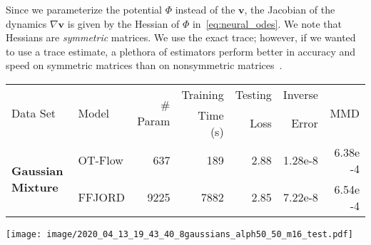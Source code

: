 \documentclass[letterpaper]{article}
\newcommand{\bfv}{\mathbf{v}}
\newcommand{\bfx}{\boldsymbol{x}}
\newcommand{\bfy}{\boldsymbol{y}}
\newcommand{\model}{OT-Flow} %
\def\eu{\ensuremath{\mathrm{e}}}
\begin{document}
    
    Since we parameterize the potential $\Phi$ instead of the $\bfv$, the Jacobian of the dynamics $\nabla \bfv$ is given by the Hessian of $\Phi$ in~\eqref{eq:neural_odes}. We note that Hessians are \emph{symmetric} matrices. We use the exact trace; however, if we wanted to use a trace estimate, a plethora of estimators perform better in accuracy and speed on symmetric matrices than on nonsymmetric matrices~\cite{hutchinson1990stochastic,avron2011randomized,ubaru2017fast}.

    



\begin{figure*}[t]
	\centering
	\begin{tabular}{llrrrrr} 
	\toprule
	\multirow{2}{*}{Data Set} & \multirow{2}{*}{Model} & \multirow{2}{*}{\# Param} & Training & Testing & Inverse & \multirow{2}{*}{MMD} \\
	&              &                     & Time (s) & Loss    & Error & \\
	\midrule
	\multirow{2}{*}{\textbf{Gaussian Mixture}} 
	& \model{} &  637 & 189  & 2.88 & 1.28\eu-8 & 6.38\eu-4 \\
	& FFJORD   & 9225 & 7882 & 2.85 & 7.22\eu-8 & 6.54\eu-4 \\ 
	\bottomrule
	\end{tabular}
	\texttt{[image: image/2020\_04\_13\_19\_43\_40\_8gaussians\_alph50\_50\_m16\_test.pdf]}
 	\caption{CNF performance heatmaps for the toy Gaussian mixture problem. (top row) $10^5$ samples $\bfx$ from the pretended unknown $\rho_0$, the forward propagations of our flow $f(\bfx)$ and the FFJORD flow.
 	(bottom row) $10^5$ samples $\bfy$ drawn from the known $\rho_1$, our model's generation $f^{-1}(\bfy)$ using the inverse flow on normal samples and FFJORD's inverse flow on the same normal samples $\bfy$. }
 	\label{fig:8gauss}
	\end{figure*}
\end{document}
